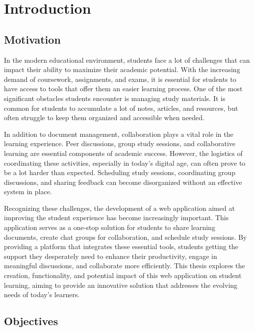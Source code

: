
\chapter{Introduction}\label{cap:intro}

\section{Motivation}\label{sect:motivation}

In the modern educational environment, students face a lot of challenges that can impact their ability to maximize their academic potential. With the increasing demand of coursework, assignments, and exams, it is essential for students to have access to tools that offer them an easier learning process. One of the most significant obstacles students encounter is managing study materials. It is common for students to accumulate a lot of notes, articles, and resources, but often struggle to keep them organized and accessible when needed. 

In addition to document management, collaboration plays a vital role in the learning experience. Peer discussions, group study sessions, and collaborative learning are essential components of academic success. However, the logistics of coordinating these activities, especially in today’s digital age, can often prove to be a lot harder than expected. Scheduling study sessions, coordinating group discussions, and sharing feedback can become disorganized without an effective system in place.

Recognizing these challenges, the development of a web application aimed at improving the student experience has become increasingly important. This application serves as a one-stop solution for students to share learning documents, create chat groups for collaboration, and schedule study sessions. By providing a platform that integrates these essential tools, students getting the support they desperately need to enhance their productivity, engage in meaningful discussions, and collaborate more efficiently. This thesis explores the creation, functionality, and potential impact of this web application on student learning, aiming to provide an innovative solution that addresses the evolving needs of today’s learners.

\section{Objectives}

